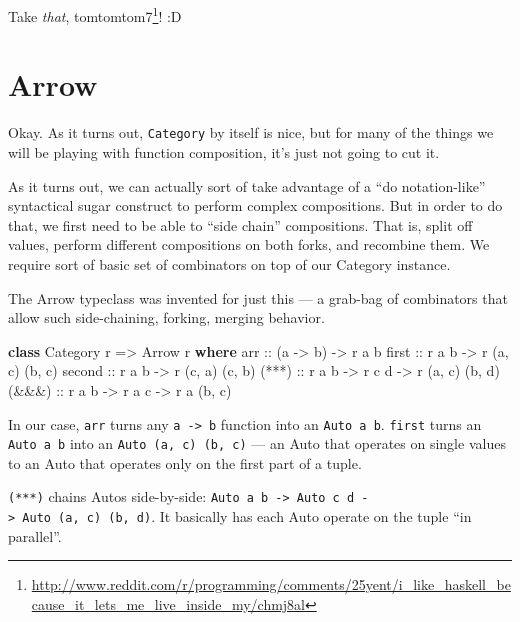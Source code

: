 \documentclass[]{article}
\newenvironment{Shaded}{}{}
\newcommand{\DataTypeTok}[1]{\textcolor[rgb]{0.56,0.13,0.00}{#1}}
\newcommand{\KeywordTok}[1]{\textcolor[rgb]{0.00,0.44,0.13}{\textbf{#1}}}
\newcommand{\NormalTok}[1]{#1}
\newcommand{\OtherTok}[1]{\textcolor[rgb]{0.00,0.44,0.13}{#1}}
\renewcommand{\href}[2]{#2\footnote{\url{#1}}}
\begin{document}
Take \emph{that},
\href{http://www.reddit.com/r/programming/comments/25yent/i_like_haskell_because_it_lets_me_live_inside_my/chmj8al}{tomtomtom7}!
:D

\hypertarget{arrow}{%
\section{Arrow}\label{arrow}}

Okay. As it turns out, \texttt{Category} by itself is nice, but for many of the
things we will be playing with function composition, it's just not going to cut
it.

As it turns out, we can actually sort of take advantage of a ``do
notation-like'' syntactical sugar construct to perform complex compositions. But
in order to do that, we first need to be able to ``side chain'' compositions.
That is, split off values, perform different compositions on both forks, and
recombine them. We require sort of basic set of combinators on top of our
Category instance.

The Arrow typeclass was invented for just this --- a grab-bag of combinators
that allow such side-chaining, forking, merging behavior.

\begin{Shaded}
\begin{Highlighting}[]
\KeywordTok{class} \DataTypeTok{Category}\NormalTok{ r }\OtherTok{=>} \DataTypeTok{Arrow}\NormalTok{ r }\KeywordTok{where}
\OtherTok{    arr    ::}\NormalTok{ (a }\OtherTok{->}\NormalTok{ b) }\OtherTok{->}\NormalTok{ r a b}
\OtherTok{    first  ::}\NormalTok{ r a b }\OtherTok{->}\NormalTok{ r (a, c) (b, c)}
\OtherTok{    second ::}\NormalTok{ r a b }\OtherTok{->}\NormalTok{ r (c, a) (c, b)}
\OtherTok{    (***)  ::}\NormalTok{ r a b }\OtherTok{->}\NormalTok{ r c d }\OtherTok{->}\NormalTok{ r (a, c) (b, d)}
\OtherTok{    (&&&)  ::}\NormalTok{ r a b }\OtherTok{->}\NormalTok{ r a c }\OtherTok{->}\NormalTok{ r a (b, c)}
\end{Highlighting}
\end{Shaded}

In our case, \texttt{arr} turns any \texttt{a\ -\textgreater{}\ b} function into
an \texttt{Auto\ a\ b}. \texttt{first} turns an \texttt{Auto\ a\ b} into an
\texttt{Auto\ (a,\ c)\ (b,\ c)} --- an Auto that operates on single values to an
Auto that operates only on the first part of a tuple.

\texttt{(***)} chains Autos side-by-side:
\texttt{Auto\ a\ b\ -\textgreater{}\ Auto\ c\ d\ -\textgreater{}\ Auto\ (a,\ c)\ (b,\ d)}.
It basically has each Auto operate on the tuple ``in parallel''.
\end{document}
